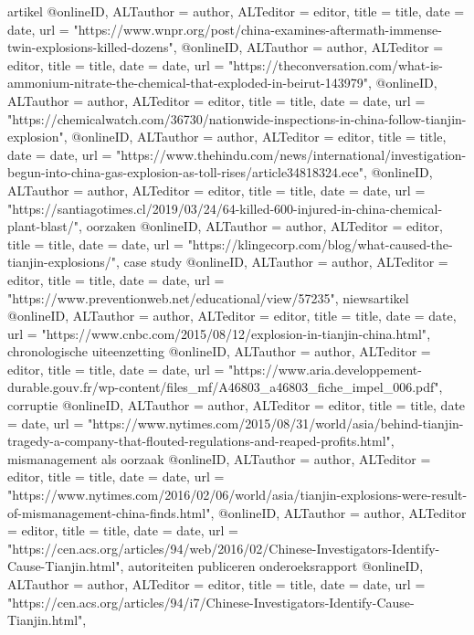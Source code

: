 {{{{{{{{{{{{{artikel
@online{ID,	ALTauthor = {author},	ALTeditor = {editor},	title = {title},	date = {date},	url = {"https://www.wnpr.org/post/china-examines-aftermath-immense-twin-explosions-killed-dozens"},}
@online{ID,	ALTauthor = {author},	ALTeditor = {editor},	title = {title},	date = {date},	url = {"https://theconversation.com/what-is-ammonium-nitrate-the-chemical-that-exploded-in-beirut-143979"},}
@online{ID,	ALTauthor = {author},	ALTeditor = {editor},	title = {title},	date = {date},	url = {"https://chemicalwatch.com/36730/nationwide-inspections-in-china-follow-tianjin-explosion"},}
@online{ID,	ALTauthor = {author},	ALTeditor = {editor},	title = {title},	date = {date},	url = {"https://www.thehindu.com/news/international/investigation-begun-into-china-gas-explosion-as-toll-rises/article34818324.ece"},}
@online{ID,	ALTauthor = {author},	ALTeditor = {editor},	title = {title},	date = {date},	url = {"https://santiagotimes.cl/2019/03/24/64-killed-600-injured-in-china-chemical-plant-blast/"},}
oorzaken
@online{ID,	ALTauthor = {author},	ALTeditor = {editor},	title = {title},	date = {date},	url = {"https://klingecorp.com/blog/what-caused-the-tianjin-explosions/"},}
case study
@online{ID,	ALTauthor = {author},	ALTeditor = {editor},	title = {title},	date = {date},	url = {"https://www.preventionweb.net/educational/view/57235"},}
niewsartikel
@online{ID,	ALTauthor = {author},	ALTeditor = {editor},	title = {title},	date = {date},	url = {"https://www.cnbc.com/2015/08/12/explosion-in-tianjin-china.html"},}
chronologische uiteenzetting
@online{ID,	ALTauthor = {author},	ALTeditor = {editor},	title = {title},	date = {date},	url = {"https://www.aria.developpement-durable.gouv.fr/wp-content/files_mf/A46803_a46803_fiche_impel_006.pdf"},}
corruptie
@online{ID,	ALTauthor = {author},	ALTeditor = {editor},	title = {title},	date = {date},	url = {"https://www.nytimes.com/2015/08/31/world/asia/behind-tianjin-tragedy-a-company-that-flouted-regulations-and-reaped-profits.html"},}
mismanagement als oorzaak
@online{ID,	ALTauthor = {author},	ALTeditor = {editor},	title = {title},	date = {date},	url = {"https://www.nytimes.com/2016/02/06/world/asia/tianjin-explosions-were-result-of-mismanagement-china-finds.html"},}
@online{ID,	ALTauthor = {author},	ALTeditor = {editor},	title = {title},	date = {date},	url = {"https://cen.acs.org/articles/94/web/2016/02/Chinese-Investigators-Identify-Cause-Tianjin.html"},}
autoriteiten publiceren onderoeksrapport
@online{ID,	ALTauthor = {author},	ALTeditor = {editor},	title = {title},	date = {date},	url = {"https://cen.acs.org/articles/94/i7/Chinese-Investigators-Identify-Cause-Tianjin.html"},}
}}}}}}}}}}}}}
